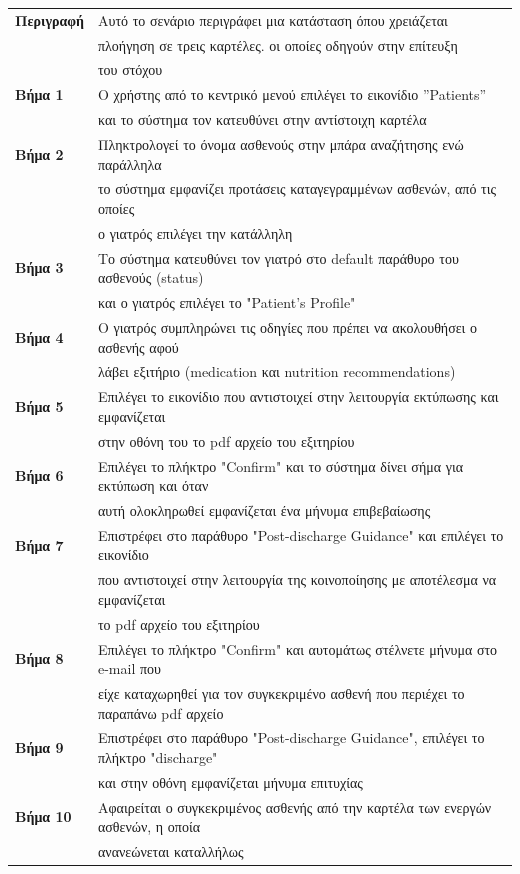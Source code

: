 \documentclass{article}
\newcommand\T{\rule{0pt}{2.6ex}}       %
\newcommand\B{\rule[-1.2ex]{0pt}{0pt}}
\begin{document}
 \begin{center}
     \begin{tabular}{|l|l|}
     \hline
      \textbf{Περιγραφή} & Αυτό το σενάριο περιγράφει μια κατάσταση όπου χρειάζεται \T \\& πλοήγηση σε τρεις καρτέλες. οι οποίες οδηγούν στην επίτευξη \\& του στόχου \B \\ 
      \hline
      \textbf{Βήμα 1} & Ο χρήστης από το κεντρικό μενού επιλέγει το εικονίδιο ”Patients” \T \\& και το σύστημα τον κατευθύνει στην αντίστοιχη καρτέλα \B \\
      \hline
      \textbf{Βήμα 2} & Πληκτρολογεί το όνομα ασθενούς στην μπάρα αναζήτησης ενώ παράλληλα \T \\& το σύστημα εμφανίζει προτάσεις καταγεγραμμένων ασθενών, από τις οποίες \\& ο γιατρός επιλέγει την κατάλληλη \B \\
      \hline
      \textbf{Βήμα 3} & Το σύστημα κατευθύνει τον γιατρό στο 
      default παράθυρο του ασθενούς (status) \T \\& και ο γιατρός επιλέγει το "Patient's Profile" \B \\
      \hline
      \textbf{Βήμα 4} & O γιατρός συμπληρώνει τις οδηγίες που πρέπει να ακολουθήσει ο ασθενής αφού \T \\& λάβει εξιτήριο (medication και nutrition recommendations) \B \\
      \hline
      \textbf{Βήμα 5} & Επιλέγει το εικονίδιο που αντιστοιχεί στην λειτουργία εκτύπωσης και εμφανίζεται \T \\& στην οθόνη του το pdf αρχείο του εξιτηρίου \B \\
      \hline
      \textbf{Βήμα 6} & Επιλέγει το πλήκτρο "Confirm" και το σύστημα δίνει σήμα για εκτύπωση και όταν \T \\& αυτή ολοκληρωθεί εμφανίζεται ένα μήνυμα επιβεβαίωσης \B \\
      \hline
      \textbf{Βήμα 7} & Επιστρέφει στο παράθυρο "Post-discharge Guidance" και επιλέγει το εικονίδιο \T \\& που αντιστοιχεί στην λειτουργία της κοινοποίησης με αποτέλεσμα να εμφανίζεται \\& το pdf αρχείο του εξιτηρίου \B \\
      \hline
      \textbf{Βήμα 8} & Επιλέγει το πλήκτρο "Confirm" και αυτομάτως στέλνετε μήνυμα στο e-mail που \T \\& είχε καταχωρηθεί για τον συγκεκριμένο ασθενή που περιέχει το παραπάνω pdf αρχείο \B \\
      \hline
      \textbf{Βήμα 9} & Επιστρέφει στο παράθυρο "Post-discharge Guidance", επιλέγει το πλήκτρο "discharge" \T \\& και στην οθόνη εμφανίζεται μήνυμα επιτυχίας \B \\
      \hline
      \textbf{Βήμα 10} & Αφαιρείται ο συγκεκριμένος ασθενής από την καρτέλα των ενεργών ασθενών, η οποία \T \\& ανανεώνεται καταλλήλως \B \\
      \hline
     \end{tabular}
 \end{center}
 
\end{document}
